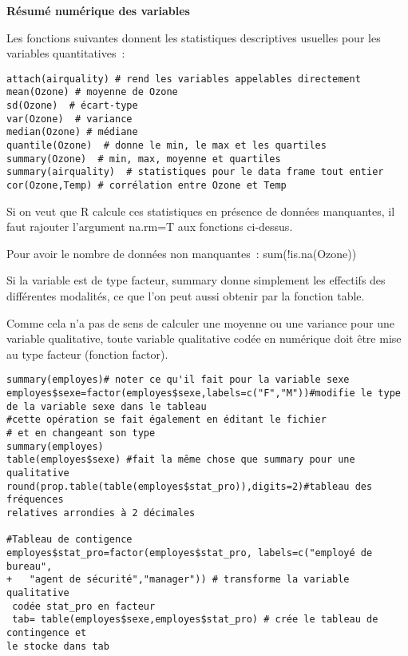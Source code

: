 \documentclass[11pt]{article}
\begin{document}
{{\bf Résumé numérique des variables}

Les fonctions suivantes donnent les statistiques descriptives usuelles pour les variables quantitatives~:

\begin{verbatim}
attach(airquality) # rend les variables appelables directement
mean(Ozone) # moyenne de Ozone
sd(Ozone)  # écart-type
var(Ozone)  # variance
median(Ozone) # médiane
quantile(Ozone)  # donne le min, le max et les quartiles
summary(Ozone)  # min, max, moyenne et quartiles
summary(airquality)  # statistiques pour le data frame tout entier
cor(Ozone,Temp) # corrélation entre Ozone et Temp

\end{verbatim}


Si on veut que R calcule ces statistiques en présence de données manquantes, il faut rajouter l'argument na.rm=T aux fonctions ci-dessus.

Pour avoir le nombre de données non manquantes~: sum(!is.na(Ozone))


\bigskip

Si la variable est de type facteur, summary donne simplement les effectifs des différentes modalités, ce que l'on peut aussi obtenir par la fonction table.

\bigskip

Comme cela n'a pas de sens de calculer une moyenne ou une variance pour une variable qualitative, toute
variable qualitative codée en numérique doit être mise au type facteur (fonction factor).
\begin{verbatim}
summary(employes)# noter ce qu'il fait pour la variable sexe
employes$sexe=factor(employes$sexe,labels=c("F","M"))#modifie le type
de la variable sexe dans le tableau
#cette opération se fait également en éditant le fichier
# et en changeant son type
summary(employes)
table(employes$sexe) #fait la même chose que summary pour une qualitative
round(prop.table(table(employes$stat_pro)),digits=2)#tableau des fréquences
relatives arrondies à 2 décimales

#Tableau de contigence
employes$stat_pro=factor(employes$stat_pro, labels=c("employé de bureau",
+   "agent de sécurité","manager")) # transforme la variable qualitative
 codée stat_pro en facteur
 tab= table(employes$sexe,employes$stat_pro) # crée le tableau de contingence et
le stocke dans tab


\end{verbatim}}
\end{document}

